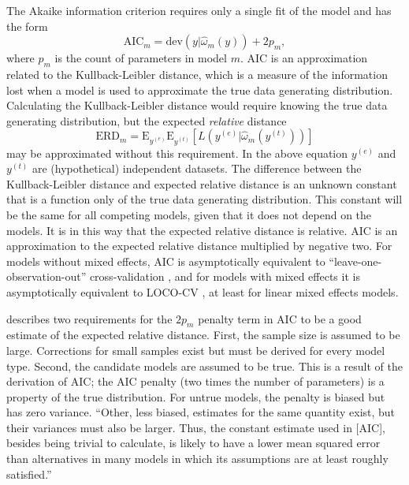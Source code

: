 The Akaike information criterion \parencite[AIC;][]{akaike1974new} requires only a single fit of the model and has the form
\begin{equation} \label{eq:aic}
	\mathrm{AIC}_m = \mathrm{dev}(y | \hat \omega_m(y)) + 2p_m
,\end{equation}
where $p_m$ is the count of parameters in model $m$. 
AIC is an approximation related to the Kullback-Leibler distance, which is a measure of the information lost when a model is used to approximate the true data generating distribution. Calculating the Kullback-Leibler distance would require knowing the true data generating distribution, but the expected \emph{relative} distance 
\begin{equation}
	\mathrm{ERD}_m = \mathrm{E}_{y^{(e)}} \mathrm{E}_{y^{(t)}} [L(y^{(e)} |\hat \omega_m(y^{(t)}))]
\end{equation}
may be approximated without this requirement.
In the above equation $y^{(e)}$ and $y^{(t)}$ are (hypothetical) independent datasets. The difference between the Kullback-Leibler distance and expected relative distance is an unknown constant that is a function only of the true data generating distribution. This constant will be the same for all competing models, given that it does not depend on the models. 
It is in this way that the expected relative distance is relative.
AIC is an approximation to the expected relative distance multiplied by negative two. For models without mixed effects, AIC is asymptotically equivalent to  ``leave-one-observation-out'' cross-validation \parencite{stone1977asymptotic}, and for models with mixed effects it is asymptotically equivalent to LOCO-CV \parencite{fang2011asymptotic}, at least for linear mixed effects models.

\textcite{Kuha2004} describes two requirements for the $2p_m$ penalty term in AIC to be a good estimate of the expected relative distance. First, the sample size is assumed to be large. Corrections for small samples exist but must be derived for every model type. Second, the candidate models are assumed to be true. This is a result of the derivation of AIC; the AIC penalty (two times the number of parameters) is a property of the true distribution. For untrue models, the penalty is biased but has zero variance. ``Other, less biased, estimates for the same quantity exist, but their variances must also be larger. Thus, the constant estimate used in [AIC], besides being trivial to calculate, is likely to have a lower mean squared error than alternatives in many models in which its assumptions are at least roughly satisfied.''

